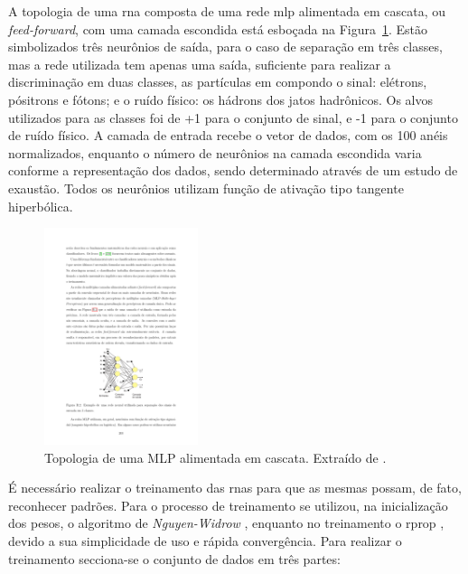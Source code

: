 
A topologia de uma \gls{rna} composta de uma rede \gls{mlp} alimentada em
cascata, ou \emph{feed-forward}, com uma camada escondida está esboçada na
Figura~\ref{fig:topologia_rna}. Estão simbolizados três neurônios de saída, para
o caso de separação em três classes, mas a rede utilizada tem apenas uma saída,
suficiente para realizar a discriminação em duas classes, as partículas \gls{em}
compondo o sinal: elétrons, pósitrons e fótons; e o ruído físico: os
hádrons dos jatos hadrônicos. Os alvos utilizados para as classes foi de +1 para o
conjunto de sinal, e -1 para o conjunto de ruído físico.
A camada de entrada recebe o vetor de dados, com os 100 anéis normalizados, enquanto o número de 
neurônios na camada escondida varia conforme a representação dos dados, 
sendo determinado através de um estudo de exaustão. Todos os neurônios utilizam
função de ativação tipo tangente hiperbólica.

\begin{figure}[ht!]
\label{fig:topologia_rna}
\centering
\includegraphics[width=0.4\textwidth]{imagens/topologia_rna.pdf}
\caption[Topologia de uma MLP alimentada em cascata.]{Topologia de uma
MLP alimentada em cascata. Extraído de \cite{tese_eduardo}.}
\end{figure}

É necessário realizar o treinamento das \glspl{rna} para que as mesmas possam, de
fato, reconhecer padrões. Para o processo de treinamento se
utilizou, na inicialização dos pesos, o algoritmo de \emph{Nguyen-Widrow} \cite{initnw}, 
enquanto no treinamento o \gls{rprop} \cite{rprop}, devido a sua simplicidade de uso e 
rápida convergência. Para realizar o treinamento secciona-se o conjunto de dados
em três partes: 

